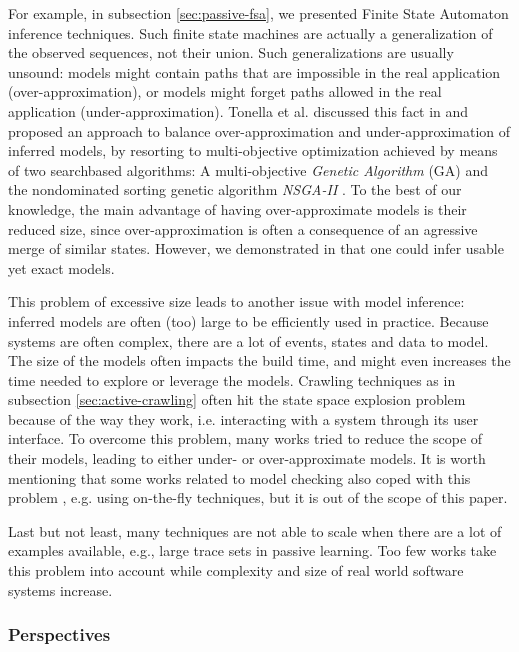 For example, in subsection \ref{sec:passive-fsa}, we presented
Finite State Automaton inference techniques. Such finite state
machines are actually a generalization of the observed sequences,
not their union. Such generalizations are usually unsound: models
might contain paths that are impossible in the real application
(over-approximation), or models might forget paths allowed in the
real application (under-approximation). Tonella et al. discussed
this fact in \cite{tonella2012finding} and proposed an approach
to balance over-approximation and under-approximation of inferred
models, by resorting to multi-objective optimization achieved by
means of two searchbased algorithms: A multi-objective
\textit{Genetic Algorithm} (GA) and the nondominated sorting
genetic algorithm \textit{NSGA-II}
\cite{Srinivas94multiobjectiveoptimization}. To the best of our
knowledge, the main advantage of having over-approximate models
is their reduced size, since over-approximation is often a
consequence of an agressive merge of similar states. However, we
demonstrated in
\cite{DBLP:conf/soict/DurandS14,DBLP:conf/fm/DurandS15,DBLP:conf/debs/SalvaD15}
that one could infer usable yet exact models.

This problem of excessive size leads to another issue with model
inference: inferred models are often (too) large to be
efficiently used in practice. Because systems are often complex,
there are a lot of events, states and data to model. The size of
the models often impacts the build time, and might even increases
the time needed to explore or leverage the models.
Crawling techniques as in subsection \ref{sec:active-crawling}
often hit the state space explosion problem because of the way
they work, i.e. interacting with a system through its user
interface. To overcome this problem, many works tried to reduce
the scope of their models, leading to either under- or
over-approximate models. It is worth mentioning that some works
related to model checking also coped with this problem
\cite{rafe2013survey}, e.g. using on-the-fly techniques, but it
is out of the scope of this paper.

Last but not least, many techniques are not able to scale when
there are a lot of examples available, e.g., large trace sets in
passive learning. Too few works take this problem into account
while complexity and size of real world software systems
increase.


\subsubsection{Perspectives}
\label{sec:discussion:perspectives}

